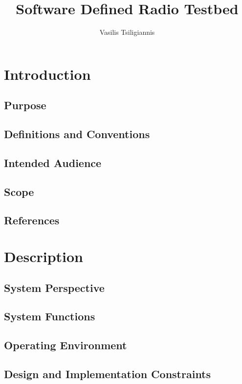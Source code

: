 \documentclass[english,titlepage,a4paper]{report}
\title{Software Defined Radio Testbed}
\author{Vasilis Tsiligiannis}
\begin{document}
\maketitle
\tableofcontents


\chapter{Introduction}
\section{Purpose}

\section{Definitions and Conventions}

\section{Intended Audience}

\section{Scope}

\section{References}


\chapter{Description}
\section{System Perspective}

\section{System Functions}

\section{Operating Environment}

\section{Design and Implementation Constraints}
\end{document}
